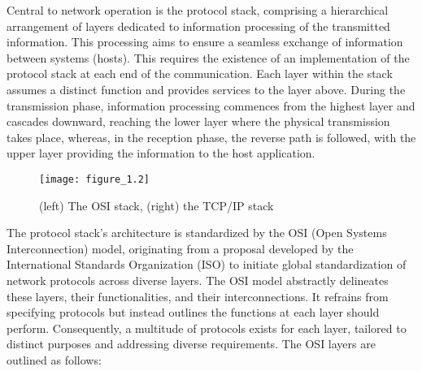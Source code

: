 
Central to network operation is the protocol stack, comprising a hierarchical arrangement of layers dedicated to information processing of the transmitted information. This processing aims to ensure a seamless exchange of information between systems (hosts). This requires the existence of an implementation of the protocol stack at each end of the communication. Each layer within the stack assumes a distinct function and provides services to the layer above. During the transmission phase, information processing commences from the highest layer and cascades downward, reaching the lower layer where the physical transmission takes place, whereas, in the reception phase, the reverse path is followed, with the upper layer providing the information to the host application.

\begin{figure}
\centering
\texttt{[image: figure\_1.2]}\\
\caption{(left) The OSI stack, (right) the TCP/IP stack}
\label{fig:figure1.2}
\end{figure}


The protocol stack's architecture is standardized by the OSI (Open Systems Interconnection) model, originating from a proposal developed by the International Standards Organization (ISO) to initiate global standardization of network protocols across diverse layers. The OSI model abstractly delineates these layers, their functionalities, and their interconnections. It refrains from specifying protocols but instead outlines the functions at each layer should perform. Consequently, a multitude of protocols exists for each layer, tailored to distinct purposes and addressing diverse requirements. The OSI layers are outlined as follows:

